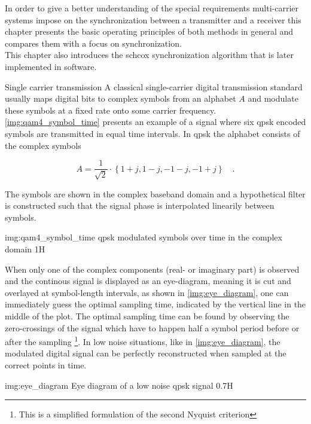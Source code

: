 In order to give a better understanding of the special
requirements multi-carrier systems impose on the
synchronization between a transmitter and a receiver
this chapter presents the basic operating principles
of both methods in general and compares them with
a focus on synchronization. \\

This chapter also introduces the \acrlong{schcox}
synchronization algorithm that is later implemented
in software.

\begin{subchapter}{Single carrier transmission}
  A classical single-carrier digital transmission standard
  usually maps digital bits to complex symbols from an
  alphabet $A$ and modulate these
  symbols at a fixed rate onto some carrier frequency. \\

  \autoref{img:qam4_symbol_time} presents an example of
  a signal where six \acrshort{qpsk} encoded symbols
  are transmitted in equal time intervals.
  In \acrshort{qpsk} the alphabet consists of the complex
  symbols

  \begin{equation*}
    A = \frac{1}{\sqrt{2}} \cdot \left\{ 1+j, 1-j, -1-j, -1+j \right\} \quad .
  \end{equation*}

  The symbols are shown in the complex baseband domain and a
  hypothetical filter is constructed such that the signal
  phase is interpolated linearily between symbols.

               {img:qam4_symbol_time}
               {\acrshort{qpsk} modulated symbols over time in the complex domain}
               {1}{H}

  When only one of the complex components (real- or imaginary part)
  is observed and the continous signal is displayed as an eye-diagram,
  meaning it is cut and overlayed at symbol-length
  intervals, as shown in \autoref{img:eye_diagram}, one can
  immediately guess the optimal sampling time, indicated by the
  vertical line in the middle of the plot.
  The optimal sampling time can be found by observing the
  zero-crossings of the signal which have to happen half a
  symbol period before or after the sampling
  \footnote{This is a simplified formulation of the second Nyquist criterion}.
  In low noise situations, like in \autoref{img:eye_diagram},
  the modulated digital signal can be perfectly reconstructed
  when sampled at the correct points in time.

                  {img:eye_diagram}
                  {Eye diagram of a low noise \acrshort{qpsk} signal}
                  {0.7}{H}
\end{subchapter}

